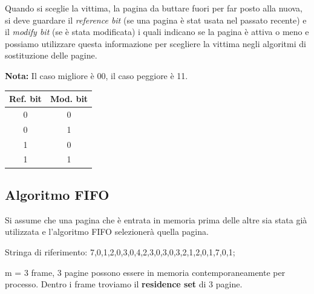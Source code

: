 \begin{center}
  \begin{minipage}{0.65\linewidth} %
    Quando si sceglie la vittima, la pagina da buttare fuori per far posto alla nuova,
    si deve guardare il \textit{reference bit} (se una pagina è stat usata nel passato recente) e il \textit{modify bit}
    (se è stata modificata) i quali indicano se la pagina è attiva o meno e possiamo
    utilizzare questa informazione per scegliere la vittima negli algoritmi di sostituzione delle pagine.

    \begin{tcolorbox}
      \textbf{Nota:} Il caso migliore è 00, il caso peggiore è 11.
    \end{tcolorbox}

  \end{minipage}%
  \hfill
  \begin{minipage}{0.3\linewidth} %
    \centering
    \renewcommand{\arraystretch}{1.5}
    \small %
    \begin{tabular}{cc}
      \hline
      \textbf{Ref. bit} & \textbf{Mod. bit} \\
      \hline
      0                 & 0                 \\
      0                 & 1                 \\
      1                 & 0                 \\
      1                 & 1                 \\
      \hline
    \end{tabular}
  \end{minipage}
\end{center}


\subsection{Algoritmo FIFO}

Si assume che una pagina che è entrata in memoria prima delle altre
sia stata già utilizzata e l'algoritmo FIFO selezionerà quella pagina.

Stringa di riferimento: 7,0,1,2,0,3,0,4,2,3,0,3,0,3,2,1,2,0,1,7,0,1;

m = 3 frame, 3 pagine possono essere in memoria contemporaneamente per processo.
Dentro i frame troviamo il \textbf{residence set} di 3 pagine.

